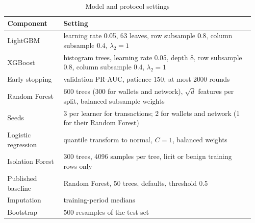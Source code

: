 \begin{table}[t]
\caption{Model and protocol settings}\label{tab:config}
\centering
\begin{tabular}{lp{5.3cm}}
\toprule
Component & Setting \\
\midrule
LightGBM & learning rate 0.05, 63 leaves, row subsample 0.8, column subsample 0.4, $\lambda_2 = 1$ \\
XGBoost & histogram trees, learning rate 0.05, depth 8, row subsample 0.8, column subsample 0.4, $\lambda_2 = 1$ \\
Early stopping & validation PR-AUC, patience 150, at most 2000 rounds \\
Random Forest & 600 trees (300 for wallets and network), $\sqrt{d}$ features per split, balanced subsample weights \\
Seeds & 3 per learner for transactions; 2 for wallets and network (1 for their Random Forest) \\
Logistic regression & quantile transform to normal, $C = 1$, balanced weights \\
Isolation Forest & 300 trees, 4096 samples per tree, licit or benign training rows only \\
Published baseline & Random Forest, 50 trees, defaults, threshold 0.5 \\
Imputation & training-period medians \\
Bootstrap & 500 resamples of the test set \\
\bottomrule
\end{tabular}
\end{table}

